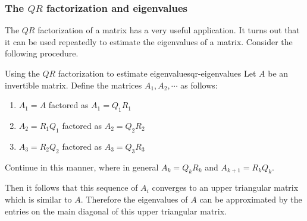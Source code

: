 \subsubsection{The $QR$ factorization and eigenvalues}

The $QR$ factorization of a matrix has a very useful application. It turns out that it can be used repeatedly to estimate the eigenvalues of a matrix. Consider the following procedure.

\begin{procedure}{Using the $QR$ factorization to estimate eigenvalues}{qr-eigenvalues}
Let $A$ be an invertible matrix. Define the matrices $A_1, A_2, \cdots$ as follows:
\begin{enumerate}
\item 
$A_1 = A$ factored as $A_1 = Q_1R_1$
\item 
$A_2 = R_1Q_1$ factored as $A_2 = Q_2R_2$
\item 
$A_3 = R_2Q_2$ factored as $A_3 = Q_3R_3$
\end{enumerate}

Continue in this manner, where in general $A_k = Q_kR_k$ and $A_{k+1} = R_kQ_k$. 

Then it follows that this sequence of $A_i$ converges to an upper triangular matrix which is similar to $A$. Therefore the eigenvalues of $A$ can be approximated by the entries on the main diagonal of this upper triangular matrix. 
\end{procedure}